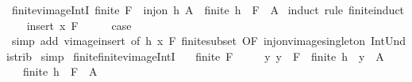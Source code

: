 \begin{isabellebody}
\ finite{\isacharunderscore}{\kern0pt}vimage{\isacharunderscore}{\kern0pt}IntI{\isacharcolon}{\kern0pt}\ {\isachardoublequoteopen}finite\ F\ {\isasymLongrightarrow}\ inj{\isacharunderscore}{\kern0pt}on\ h\ A\ {\isasymLongrightarrow}\ finite\ {\isacharparenleft}{\kern0pt}h\ {\isacharminus}{\kern0pt}{\isacharbackquote}{\kern0pt}\ F\ {\isasyminter}\ A{\isacharparenright}{\kern0pt}{\isachardoublequoteclose}\isanewline
%
\isadelimproof
%
\endisadelimproof
%
\isatagproof
{}\isamarkupfalse%
\ {\isacharparenleft}{\kern0pt}induct\ rule{\isacharcolon}{\kern0pt}\ finite{\isacharunderscore}{\kern0pt}induct{\isacharparenright}{\kern0pt}\isanewline
\ \ \isamarkupfalse%
\ {\isacharparenleft}{\kern0pt}insert\ x\ F{\isacharparenright}{\kern0pt}\isanewline
\ \ \isamarkupfalse%
\ \isamarkupfalse%
\ {\isacharquery}{\kern0pt}case\isanewline
\ \ \ \ \isamarkupfalse%
\ {\isacharparenleft}{\kern0pt}simp\ add{\isacharcolon}{\kern0pt}\ vimage{\isacharunderscore}{\kern0pt}insert\ {\isacharbrackleft}{\kern0pt}of\ h\ x\ F{\isacharbrackright}{\kern0pt}\ finite{\isacharunderscore}{\kern0pt}subset\ {\isacharbrackleft}{\kern0pt}OF\ inj{\isacharunderscore}{\kern0pt}on{\isacharunderscore}{\kern0pt}vimage{\isacharunderscore}{\kern0pt}singleton{\isacharbrackright}{\kern0pt}\ Int{\isacharunderscore}{\kern0pt}Un{\isacharunderscore}{\kern0pt}distrib{}{\isacharparenright}{\kern0pt}\isanewline
{}\isamarkupfalse%
\ simp%
\endisatagproof
{\isafoldproof}%
%
\isadelimproof
\isanewline
%
\endisadelimproof
\isanewline
{}\isamarkupfalse%
\ finite{\isacharunderscore}{\kern0pt}finite{\isacharunderscore}{\kern0pt}vimage{\isacharunderscore}{\kern0pt}IntI{\isacharcolon}{\kern0pt}\isanewline
\ \ \ {\isachardoublequoteopen}finite\ F{\isachardoublequoteclose}\isanewline
\ \ \ \ \ {\isachardoublequoteopen}{\isasymAnd}y{\isachardot}{\kern0pt}\ y\ {\isasymin}\ F\ {\isasymLongrightarrow}\ finite\ {\isacharparenleft}{\kern0pt}{\isacharparenleft}{\kern0pt}h\ {\isacharminus}{\kern0pt}{\isacharbackquote}{\kern0pt}\ {\isacharbraceleft}{\kern0pt}y{\isacharbraceright}{\kern0pt}{\isacharparenright}{\kern0pt}\ {\isasyminter}\ A{\isacharparenright}{\kern0pt}{\isachardoublequoteclose}\isanewline
\ \ \ {\isachardoublequoteopen}finite\ {\isacharparenleft}{\kern0pt}h\ {\isacharminus}{\kern0pt}{\isacharbackquote}{\kern0pt}\ F\ {\isasyminter}\ A{\isacharparenright}{\kern0pt}{\isachardoublequoteclose}\isanewline
%
\isadelimproof
%
\endisadelimproof
%
\isatagproof

\end{isabellebody}
